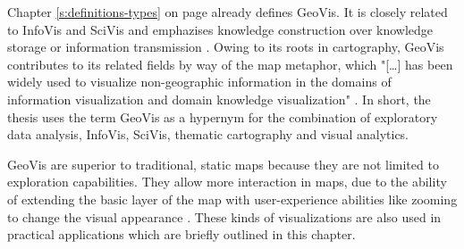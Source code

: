 Chapter \ref{s:definitions-types} on page \pageref{s:definitions-types} already defines \ac{GeoVis}. It is closely related to \ac{InfoVis} and \ac{SciVis} and emphazises knowledge construction over knowledge storage or information transmission . Owing to its roots in cartography, \ac{GeoVis} contributes to its related fields by way of the map metaphor, which "[\ldots] has been widely used to visualize non-geographic information in the domains of information visualization and domain knowledge visualization" .
In short, the thesis uses the term \ac{GeoVis} as a hypernym for the combination of exploratory data analysis, \ac{InfoVis}, \ac{SciVis}, thematic cartography and visual analytics.

\ac{GeoVis} are superior to traditional, static maps because they are not limited to exploration capabilities. They allow more interaction in maps, due to the ability of extending the basic layer of the map with user-experience abilities like zooming to change the visual appearance . These kinds of visualizations are also used in practical applications which are briefly outlined in this chapter.

